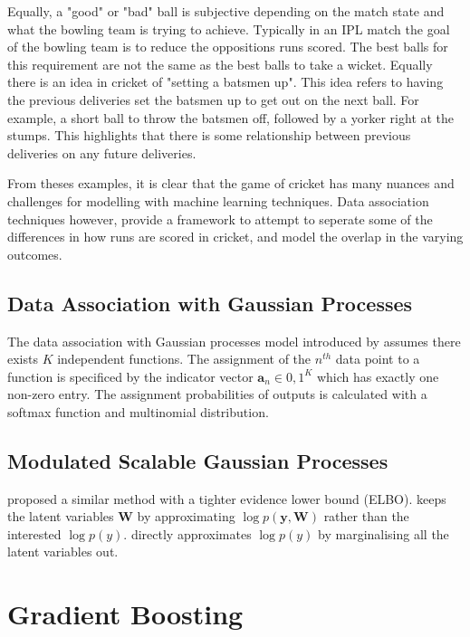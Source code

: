 \documentclass[12pt,a4paper]{report}
\theoremstyle{definition}
\begin{document}
Equally, a "good" or "bad" ball is subjective depending on the match state and what the bowling team is trying to achieve. 
Typically in an IPL match the goal of the bowling team is to reduce the oppositions runs scored. 
The best balls for this requirement are not the same as the best balls to take a wicket. 
Equally there is an idea in cricket of "setting a batsmen up". 
This idea refers to having the previous deliveries set the batsmen up to get out on the next ball. 
For example, a short ball to throw the batsmen off, followed by a yorker right at the stumps. 
This highlights that there is some relationship between previous deliveries on any future deliveries.

From theses examples, it is clear that the game of cricket has many nuances and challenges for modelling with machine learning techniques. 
Data association techniques however, provide a framework to attempt to seperate some of the differences in how runs are scored in cricket, and model the overlap in the varying outcomes.

\subsection{Data Association with Gaussian Processes}

The data association with Gaussian processes model introduced by \citet{Kaiser2018} assumes there exists $K$ independent functions.
The assignment of the $n^{th}$ data point to a function is specificed by the indicator vector $\textbf{a}_{n} \in {0, 1}^K$ which has exactly one non-zero entry.
The assignment probabilities of outputs is calculated with a softmax function and multinomial distribution. 

\subsection{Modulated Scalable Gaussian Processes}

\citet{Lui2020} proposed a similar method with a tighter evidence lower bound (ELBO).
\citet{Kaiser2018} keeps the latent variables $\textbf{W}$ by approximating $\log p(\textbf{y}, \textbf{W})$ rather than the interested $\log p(y)$.
\citet{Lui2020} directly approximates $\log p(y)$ by marginalising all the latent variables out.

\section{Gradient Boosting}
\end{document}
